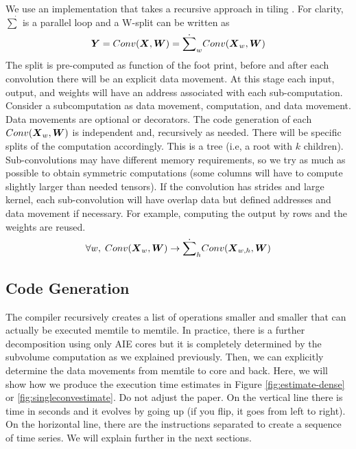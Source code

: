 \documentclass[conference]{IEEEtran}
\begin{document}
We use an implementation that takes a recursive approach in tiling
\cite{abs-2110-04327}. For clarity, $\dot{\sum}$ is a parallel loop
and a W-split can be written as
\begin{equation}
  {\boldsymbol Y} =  Conv({\boldsymbol X},{\boldsymbol W}) = \dot{\sum}_w
  Conv({\boldsymbol X}_w,{\boldsymbol W})
\end{equation}
The split is pre-computed as function of the foot print, before and
after each convolution there will be an explicit data movement. At
this stage each input, output, and weights will have an address
associated with each sub-computation. Consider a subcomputation as
data movement, computation, and data movement. Data movements are
optional or decorators.  The code generation of each
$Conv({\boldsymbol X}_w,{\boldsymbol W})$ is independent and, recursively as needed.
There will be specific splits of the computation accordingly. This is
a tree (i.e, a root with $k$ children). Sub-convolutions may have
different memory requirements, so we try as much as possible to obtain
symmetric computations (some columns will have to compute slightly
larger than needed tensors). If the convolution has strides and large
kernel, each sub-convolution will have overlap data but defined
addresses and data movement if necessary. For example, computing the
output by rows and the weights are reused.
\begin{equation}
  \forall w, \;   Conv({\boldsymbol X}_w,{\boldsymbol W}) \rightarrow  \dot{\sum}_h Conv({\boldsymbol X}_{w,h},{\boldsymbol W})
\end{equation}





\subsection{Code Generation }
The compiler recursively creates a list of operations smaller and
smaller that can actually be executed memtile to memtile. In practice,
there is a further decomposition using only AIE cores but it is
completely determined by the subvolume computation as we explained
previously. Then, we can explicitly determine the data movements from
memtile to core and back. Here, we will show how we produce the
execution time estimates in Figure \ref{fig:estimate-dense} or
\ref{fig:singleconvestimate}.  Do not adjust the paper. On the
vertical line there is time in seconds and it evolves by going up (if
you flip, it goes from left to right). On the horizontal line, there
are the instructions separated to create a sequence of time series. We
will explain further in the next sections.
\end{document}
